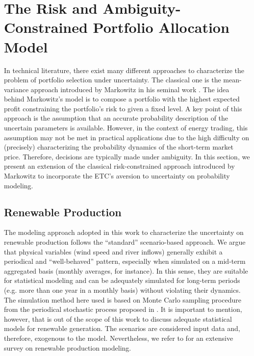 \section{The Risk and Ambiguity-Constrained Portfolio Allocation Model}
\label{OptContrStrat}

	In technical literature, there exist many different approaches to characterize the problem of portfolio selection under uncertainty. The classical one is the mean-variance approach introduced by Markowitz in his seminal work \cite{PortSelect_Markovitz}. The idea behind Markowitz's model is to compose a portfolio with the highest expected profit constraining the portfolio's risk to given a fixed level. A key point of this approach is the assumption that an accurate probability description of the uncertain parameters is available. However, in the context of energy trading, this assumption may not be met in practical applications due to the high difficulty on (precisely) characterizing the probability dynamics of the short-term market price. Therefore, decisions are typically made under ambiguity. In this section, we present an extension of the classical risk-constrained approach introduced by Markowitz to incorporate the ETC's aversion to uncertainty on probability modeling.

\subsection{Renewable Production}
\label{SimRenGen}

	The modeling approach adopted in this work to characterize the uncertainty on renewable production follows the ``standard'' scenario-based approach. We argue that physical variables (wind speed and river inflows) generally exhibit a periodical and ``well-behaved'' pattern, especially when simulated on a mid-term aggregated basis (monthly averages, for instance). In this sense, they are suitable for statistical modeling and can be adequately simulated for long-term periods (e.g. more than one year in a monthly basis) without violating their dynamics. The simulation method here used is based on Monte Carlo sampling procedure \cite{Birge_StochProgm} from the periodical stochastic process proposed in \cite{FosteringWPP}. It is important to mention, however, that is out of the scope of this work to discuss adequate statistical models for renewable generation. The scenarios are considered input data and, therefore, exogenous to the model. Nevertheless, we refer to \cite{ReviewProbForecastWP} for an extensive survey on renewable production modeling.

